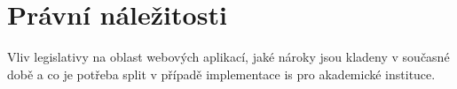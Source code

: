 \chapter{Právní náležitosti}

Vliv legislativy na oblast webových aplikací, jaké nároky jsou kladeny v současné době a co je potřeba split v případě implementace \gls{is} pro akademické instituce.

